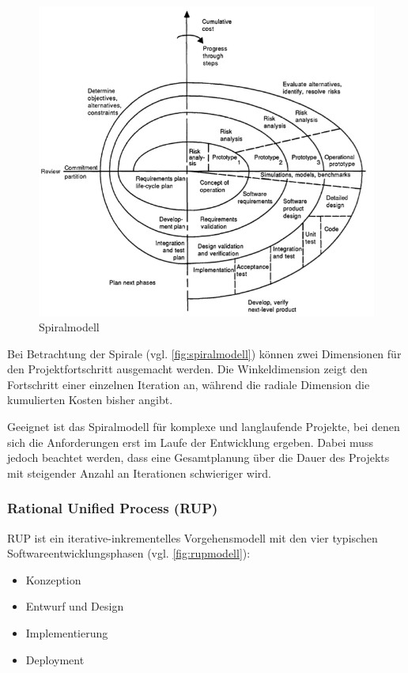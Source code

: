 \begin{figure}
  \centering
  \includegraphics[width=\textwidth]{img/spiralmodell.png}
  \caption{Spiralmodell \parencite[][S. 64]{Boehm:1988aa}}
  \label{fig:spiralmodell}
\end{figure}

Bei Betrachtung der Spirale (vgl. \autoref{fig:spiralmodell}) können zwei Dimensionen für den Projektfortschritt ausgemacht werden.
Die Winkeldimension zeigt den Fortschritt einer einzelnen Iteration an, während die radiale Dimension die kumulierten Kosten bisher angibt.
\parencite[Vgl. ][S. 65]{Boehm:1988aa}

Geeignet ist das Spiralmodell für komplexe und langlaufende Projekte, bei denen sich die Anforderungen erst im Laufe der Entwicklung ergeben. 
Dabei muss jedoch beachtet werden, dass eine Gesamtplanung über die Dauer des Projekts mit steigender Anzahl an Iterationen schwieriger wird. \parencite[Vgl.][S. 58]{Schatten:2010aa}

\subsubsection{Rational Unified Process (RUP)}

RUP ist ein iterative-inkrementelles Vorgehensmodell mit den vier typischen Softwareentwicklungsphasen (vgl. \autoref{fig:rupmodell}):

\begin{itemize}
\item Konzeption
\item Entwurf und Design
\item Implementierung
\item Deployment
\end{itemize}

